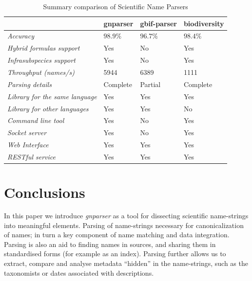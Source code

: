 \documentclass{bmcart}
\begin{document}
\begin{table}[htb]
  \begin{center}
    \caption{Summary comparison of Scientific Name Parsers}
    \label{table:summary}
    \resizebox{12.5cm}{!} {
    \begin{tabular}{|l|*{3}{l}|}
      \hline
                             & gnparser & gbif-parser & biodiversity \\
      \hline
      \textit{Accuracy}                     & $98.9\%$ & $96.7\%$ & $98.4\%$\\
      \textit{Hybrid formulas support}      & Yes      & No       & Yes     \\
      \textit{Infrasubspecies support}      & Yes      & No       & Yes     \\
      \textit{Throughput (names/s)}         & 5944     & 6389     & 1111    \\
      \textit{Parsing details}              & Complete & Partial  & Complete\\
      \textit{Library for the same language}& Yes      & Yes      & Yes     \\
      \textit{Library for other languages}  & Yes      & Yes      & No      \\
      \textit{Command line tool}            & Yes      & No       & Yes     \\
      \textit{Socket server}                & Yes      & No       & Yes     \\
      \textit{Web Interface}                & Yes      & Yes      & Yes     \\
      \textit{RESTful service}              & Yes      & Yes      & Yes     \\
      \hline
    \end{tabular}
  }
  \end{center}
\end{table}

\section*{Conclusions}

In this paper we introduce \textit{gnparser} as a tool for dissecting
scientific name-strings into meaningful elements. Parsing of name-strings necessary for canonicalization of names; in turn a key component of name matching and data integration. Parsing is  also an aid to finding names in sources, and sharing them in standardised
forms (for example as an index). Parsing further allows us to extract, compare and analyse metadata
``hidden'' in the name-strings, such as the  taxonomists or dates associated
with descriptions.
\end{document}
